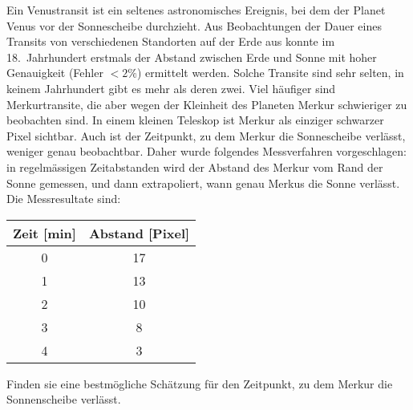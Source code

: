 Ein Venustransit ist ein seltenes astronomisches Ereignis, bei dem
der Planet Venus vor der Sonnescheibe durchzieht.
Aus Beobachtungen der Dauer eines Transits von verschiedenen Standorten
auf der Erde aus konnte im 18.~Jahrhundert erstmals der Abstand
zwischen Erde und Sonne mit hoher Genauigkeit (Fehler $< 2\%$) ermittelt
werden. Solche Transite sind sehr selten, in keinem Jahrhundert gibt es
mehr als deren zwei. Viel häufiger sind Merkurtransite, die aber wegen
der Kleinheit des Planeten Merkur schwieriger zu beobachten sind.
In einem kleinen Teleskop ist Merkur als einziger schwarzer Pixel
sichtbar. Auch ist der Zeitpunkt, zu dem Merkur die Sonnescheibe
verlässt, weniger genau beobachtbar. Daher wurde folgendes Messverfahren
vorgeschlagen: in regelmässigen Zeitabstanden wird der Abstand des
Merkur vom Rand der Sonne gemessen, und dann extrapoliert, wann genau
Merkus die Sonne verlässt. Die Messresultate sind:
\begin{center}
\begin{tabular}{cc}
Zeit [min]&Abstand [Pixel]\\
\hline
0&17\\
1&13\\
2&10\\
3&8\\
4&3\\
\hline
\end{tabular}
\end{center}
Finden sie eine bestmögliche Schätzung für den Zeitpunkt, zu dem
Merkur die Sonnenscheibe verlässt.



